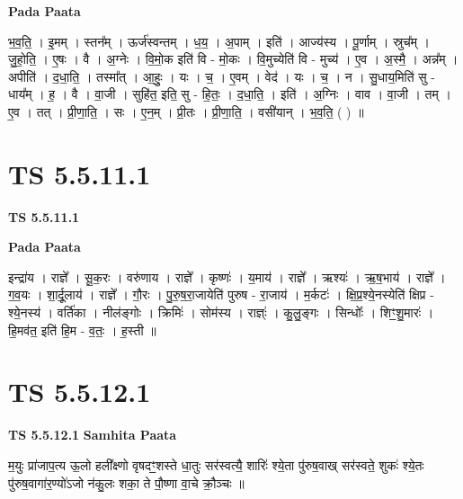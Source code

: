 \documentclass[17pt]{extarticle}
\begin{document}
\textbf{Pada Paata} \newline

भ॒व॒ति॒ । इ॒मम् । स्तन᳚म् । ऊर्ज॑स्वन्तम् । ध॒य॒ । अ॒पाम् । इति॑ । आज्य॑स्य । पू॒र्णाम् । स्रुच᳚म् । जु॒हो॒ति॒ । ए॒षः । वै । अ॒ग्नेः । वि॒मो॒क इति॑ वि - मो॒कः । वि॒मुच्येति॑ वि - मुच्य॑ । ए॒व । अ॒स्मै॒ । अन्न᳚म् । अपीति॑ । द॒धा॒ति॒ । तस्मा᳚त् । आ॒हुः॒ । यः । च॒ । ए॒वम् । वेद॑ । यः । च॒ । न । सु॒धाय॒मिति॑ सु - धाय᳚म् । ह॒ । वै । वा॒जी । सुहि॑त॒ इति॒ सु - हि॒तः॒ । द॒धा॒ति॒ । इति॑ । अ॒ग्निः । वाव । वा॒जी । तम् । ए॒व । तत् । प्री॒णा॒ति॒ । सः । ए॒न॒म् । प्री॒तः । प्री॒णा॒ति॒ । वसी॑यान् । भ॒व॒ति॒ ( ) ॥  \newline




\section*{ TS 5.5.11.1 }

\textbf{TS 5.5.11.1 } \newline

\textbf{Pada Paata} \newline

इन्द्रा॑य । राज्ञे᳚ । सू॒क॒रः । वरु॑णाय । राज्ञे᳚ । कृष्णः॑ । य॒माय॑ । राज्ञे᳚ । ऋश्यः॑ । ऋ॒ष॒भाय॑ । राज्ञे᳚ । ग॒व॒यः । शा॒र्दू॒लाय॑ । राज्ञे᳚ । गौ॒रः । पु॒रु॒ष॒रा॒जायेति॑ पुरुष - रा॒जाय॑ । म॒र्कटः॑ । क्षि॒प्र॒श्ये॒नस्येति॑ क्षिप्र - श्ये॒नस्य॑ । वर्ति॑का । नील॑ङ्गोः । क्रिमिः॑ । सोम॑स्य । राज्ञ्ः॑ । कु॒लु॒ङ्गः । सिन्धोः᳚ । शिꣳ॒॒शु॒मारः॑ । हि॒मव॑त॒ इति॑ हि॒म - व॒तः॒ । ह॒स्ती ॥  \newline




\section*{ TS 5.5.12.1 }

\textbf{TS 5.5.12.1 } \newline
\textbf{Samhita Paata} \newline

म॒युः प्रा॑जाप॒त्य ऊ॒लो हली᳚क्ष्णो वृषदꣳ॒॒शस्ते धा॒तुः सर॑स्वत्यै॒ शारिः॑ श्ये॒ता पु॑रुष॒वाख् सर॑स्वते॒ शुकः॑ श्ये॒तः पु॑रुष॒वागा॑र॒ण्यो॑ऽजो न॑कु॒लः शका॒ ते पौ॒ष्णा वा॒चे क्रौ॒ञ्चः ॥ \newline
\end{document}
